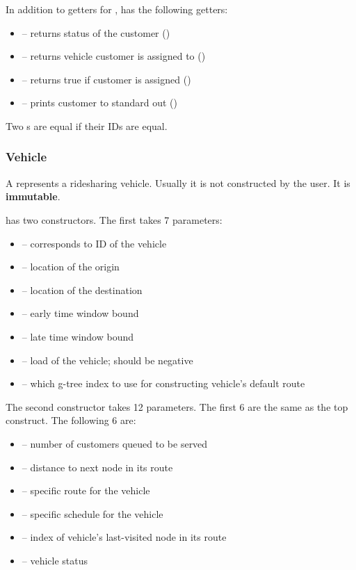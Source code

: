  In addition to getters for ,  has the
following getters:
\begin{itemize}
    \item[]  -- returns status of the customer ()
    \item[]  -- returns vehicle customer is assigned to ()
    \item[]  -- returns true if customer is assigned ()
    \item[]  -- prints customer to standard out ()
\end{itemize}


Two s are equal if their IDs are equal.

\subsubsection{Vehicle}

A  represents a ridesharing vehicle. Usually it is not
constructed by the user. It is \textbf{immutable}.

  has two constructors. The first takes
7 parameters:
\begin{itemize}
    \item[]  -- corresponds to ID of the vehicle
    \item[]  -- location of the origin
    \item[]  -- location of the destination
    \item[]  -- early time window bound
    \item[]  -- late time window bound
    \item[]  -- load of the vehicle; should be negative
    \item[]  -- which g-tree index to use for constructing
        vehicle's default route
\end{itemize}
\hi{} The second constructor takes 12 parameters. The first 6 are the same
as the top construct. The following 6 are:
\begin{itemize}
    \item[]  -- number of customers queued to be served
    \item[]  -- distance to next node in its route
    \item[]  -- specific route for the vehicle
    \item[]  -- specific schedule for the vehicle
    \item[]  -- index of vehicle's last-visited node in its route
    \item[]  -- vehicle status
\end{itemize}

